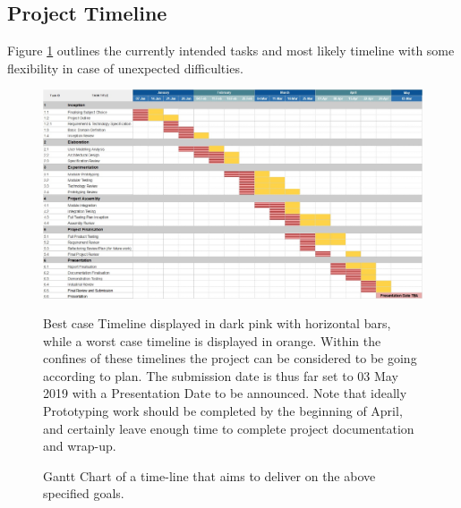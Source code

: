 \documentclass{article}
\begin{document}
  \subsection{Project Timeline}
  
  Figure \ref{fig:gantt} outlines the currently intended tasks and most likely timeline with some flexibility in case of unexpected difficulties.

    \begin{figure}[h]
      \centering
      \includegraphics[width=\linewidth]{figures/ProjectPlan.jpg}
      \caption{Gantt Chart of a time-line that aims to deliver on the above specified goals.} Best case Timeline displayed in dark pink with horizontal bars, while a worst case timeline is displayed in orange. Within the confines of these timelines the project can be considered to be going according to plan. The submission date is thus far set to 03 May 2019 with a Presentation Date to be announced. Note that ideally Prototyping work should be completed by the beginning of April, and certainly leave enough time to complete project documentation and wrap-up.
      \label{fig:gantt}
    \end{figure}

\newpage


\end{document}
